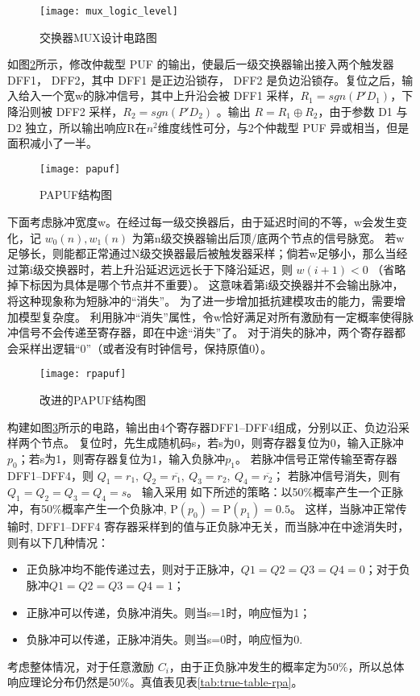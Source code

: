 \begin{figure}[htb]
\centering
\texttt{[image: mux\_logic\_level]}
\caption{交换器MUX设计电路图}
\label{fig:mux_logic}
\end{figure}

如图\ref{fig:papuf}所示，修改仲裁型 PUF 的输出，使最后一级交换器输出接入两个触发器 DFF1， DFF2，其中 DFF1 是正边沿锁存， DFF2 是负边沿锁存。复位之后，输入给入一个宽w的脉冲信号，其中上升沿会被 DFF1 采样，$ R_1=sgn(P'D_1 ) $，下降沿则被 DFF2 采样，$ R_2=sgn(P'D_2 ) $ 。输出 $ R=R_1\oplus R_2 $，由于参数 D1 与 D2 独立，所以输出响应R在$ n^2 $维度线性可分，与2个仲裁型 PUF 异或相当，但是面积减小了一半。

\begin{figure}[htb]
\centering
\texttt{[image: papuf]}
\caption{PAPUF结构图}
\label{fig:papuf}
\end{figure}

下面考虑脉冲宽度w。在经过每一级交换器后，由于延迟时间的不等，w会发生变化，记 $ w_0 (n),w_1 (n) $ 为第n级交换器输出后顶/底两个节点的信号脉宽。
若w足够长，则能都正常通过N级交换器最后被触发器采样；倘若w足够小，那么当经过第i级交换器时，若上升沿延迟远远长于下降沿延迟，则 $ w(i+1)<0 $ （省略掉下标因为具体是哪个节点并不重要）。
这意味着第i级交换器并不会输出脉冲，将这种现象称为短脉冲的``消失''。
为了进一步增加抵抗建模攻击的能力，需要增加模型复杂度。
利用脉冲``消失''属性，令w恰好满足对所有激励有一定概率使得脉冲信号不会传递至寄存器，即在中途``消失''了。
对于消失的脉冲，两个寄存器都会采样出逻辑``0''（或者没有时钟信号，保持原值0）。

\begin{figure}[htb]
\centering
\texttt{[image: rpapuf]}
\caption{改进的PAPUF结构图}
\label{fig:rpapuf}
\end{figure}

构建如图\ref{fig:rpapuf}所示的电路，输出由4个寄存器DFF1--DFF4组成，分别以正、负边沿采样两个节点。
复位时，先生成随机码s，若s为0，则寄存器复位为0，输入正脉冲$ {p}_0 $；若s为1，则寄存器复位为1，输入负脉冲$ {p}_1 $。
若脉冲信号正常传输至寄存器DFF1--DFF4，则 $ Q_1=r_1,~Q_2=\overline{r_1},~Q_3=r_2,~Q_4=\overline{r_2} $； 若脉冲信号消失，则有 $ Q_1=Q_2=Q_3=Q_4=s $。
输入采用 如下所述的策略：以50\%概率产生一个正脉冲，有50\%概率产生一个负脉冲, $ \mathrm{P}(p_0)=\mathrm{P}(p_1)=0.5  $。
这样，当脉冲正常传输时, DFF1--DFF4 寄存器采样到的值与正负脉冲无关，而当脉冲在中途消失时，则有以下几种情况：

\begin{itemize}
\item 正负脉冲均不能传递过去，则对于正脉冲，$ Q1=Q2=Q3=Q4=0 $；对于负脉冲$ Q1=Q2=Q3=Q4=1 $；
\item 正脉冲可以传递，负脉冲消失。则当s=1时，响应恒为1；
\item 负脉冲可以传递，正脉冲消失。则当s=0时，响应恒为0.
\end{itemize}
考虑整体情况，对于任意激励 $ C_i $，由于正负脉冲发生的概率定为50\%，所以总体响应理论分布仍然是50\%。真值表见表\ref{tab:true-table-rpa}。

